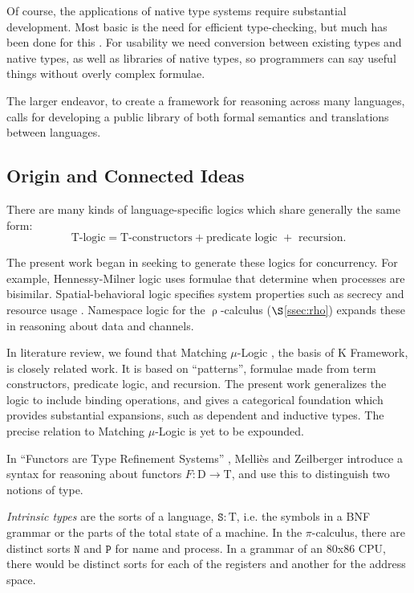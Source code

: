 \documentclass[conference]{IEEEtran}
\theoremstyle{definition}
\newcommand{\mrm}[1]{\mathrm{#1}}
\newcommand{\mtt}[1]{\mathtt{#1}}
\newcommand{\T}{\mrm{T}}
\newcommand{\tts}{\mtt{S}}
\newcommand{\N}{\mtt{N}}
\newcommand{\PP}{\mtt{P}}
\begin{document}
Of course, the applications of native type systems require substantial development. Most basic is the need for efficient type-checking, but much has been done for this \cite{coqTypeCheck}. For usability we need conversion between existing types and native types, as well as libraries of native types, so programmers can say useful things without overly complex formulae.

The larger endeavor, to create a framework for reasoning across many languages, calls for developing a public library of both formal semantics and translations between languages.

\subsection{Origin and Connected Ideas}
\label{ssec:connected}

There are many kinds of language-specific logics which share generally the same form:
\[\T\text{-logic} = \T\text{-constructors} + \text{predicate logic } + \text{ recursion}.\]

The present work began in seeking to generate these logics for concurrency. For example, Hennessy-Milner logic \cite{hml} uses formulae that determine when processes are bisimilar. Spatial-behavioral logic \cite{caires} specifies system properties such as secrecy and resource usage \cite{spatial}. Namespace logic \cite{namespace} for the $\uprho$-calculus \cite{rhocal} ($\S$\ref{ssec:rho}) expands these in reasoning about data and channels.

In literature review, we found that Matching $\mu$-Logic \cite{matchlog}, the basis of K Framework, is closely related work. It is based on ``patterns'', formulae made from term constructors, predicate logic, and recursion.  The present work generalizes the logic to include binding operations, and gives a categorical foundation which provides substantial expansions, such as dependent and inductive types. The precise relation to Matching $\mu$-Logic is yet to be expounded.

In ``Functors are Type Refinement Systems'' \cite{refine}, Melli\`es and Zeilberger introduce a syntax for reasoning about functors $F:\mrm{D}\to \T$, and use this to distinguish two notions of type.

\textit{Intrinsic types} are the sorts of a language, $\tts:\T$, i.e. the symbols in a BNF grammar or the parts of the total state of a machine. In the $\pi$-calculus, there are distinct sorts $\N$ and $\PP$ for name and process. In a grammar of an 80x86 CPU, there would be distinct sorts for each of the registers and another for the address space.
\end{document}
